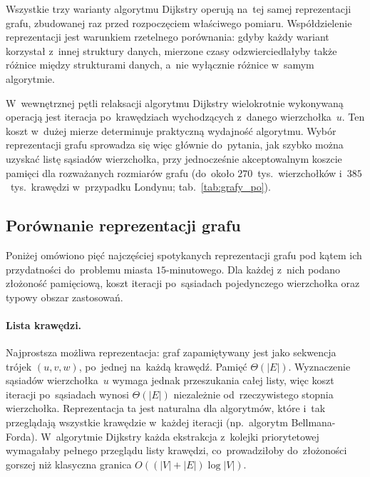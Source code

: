 Wszystkie trzy warianty algorytmu Dijkstry operują na~tej samej reprezentacji grafu,
zbudowanej raz przed rozpoczęciem właściwego pomiaru. Współdzielenie reprezentacji jest
warunkiem rzetelnego porównania: gdyby każdy wariant korzystał z~innej struktury danych,
mierzone czasy odzwierciedlałyby także różnice między strukturami danych,
a~nie wyłącznie różnice w~samym algorytmie.

\clearpage

W~wewnętrznej pętli relaksacji algorytmu Dijkstry wielokrotnie wykonywaną operacją jest
iteracja po~krawędziach wychodzących z~danego wierzchołka~$u$. Ten koszt
w~dużej mierze determinuje praktyczną wydajność algorytmu. Wybór reprezentacji grafu sprowadza się
więc głównie do~pytania, jak szybko można uzyskać listę sąsiadów wierzchołka, przy
jednocześnie akceptowalnym koszcie pamięci dla rozważanych rozmiarów grafu (do~około
$270$~tys.\ wierzchołków i~$385$~tys.\ krawędzi w~przypadku Londynu;
tab.~\ref{tab:grafy_po}).

\subsection{Porównanie reprezentacji grafu}
\label{subsec:impl:reprezentacja:porownanie}

Poniżej omówiono pięć najczęściej spotykanych reprezentacji grafu pod kątem ich przydatności
do~problemu miasta $15$-minutowego. Dla każdej z~nich podano złożoność pamięciową, koszt
iteracji po~sąsiadach pojedynczego wierzchołka oraz typowy obszar zastosowań.

\paragraph{Lista krawędzi.}
Najprostsza możliwa reprezentacja: graf zapamiętywany jest jako sekwencja trójek $(u,v,w)$,
po~jednej na~każdą krawędź. Pamięć $\Theta(|E|)$. Wyznaczenie sąsiadów wierzchołka~$u$
wymaga jednak przeszukania całej listy, więc koszt iteracji po~sąsiadach wynosi
$\Theta(|E|)$ niezależnie od~rzeczywistego stopnia wierzchołka. Reprezentacja ta jest
naturalna dla algorytmów, które i~tak przeglądają wszystkie krawędzie w~każdej iteracji
(np.\ algorytm Bellmana-Forda).
W~algorytmie Dijkstry każda ekstrakcja z~kolejki priorytetowej wymagałaby pełnego przeglądu
listy krawędzi, co~prowadziłoby do~złożoności gorszej niż klasyczna granica
$O((|V|+|E|)\log|V|)$.

